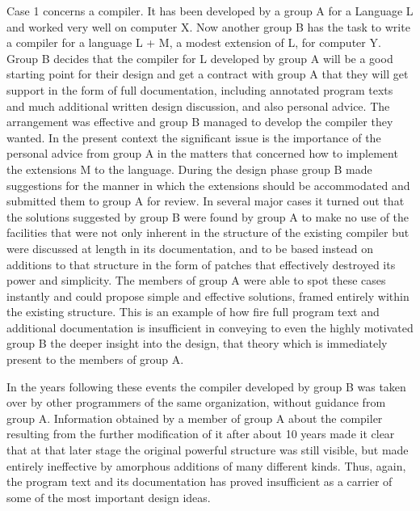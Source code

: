 \documentclass[12pt,letterpaper,twocolumn]{article}
\begin{document}
Case 1 concerns a compiler. It has been developed by a group A for a Language L and worked very well on computer X. Now another group B has the task to write a compiler for a language L + M, a modest extension of L, for computer Y. Group B decides that the compiler for L developed by group A will be a good starting point for their design and get a contract with group A that they will get support in the form of full documentation, including annotated program texts and much additional written design discussion, and also personal advice. The arrangement was effective and group B managed to develop the compiler they wanted. In the present context the significant issue is the importance of the personal advice from group A in the matters that concerned how to implement the extensions M to the language. During the design phase group B made suggestions for the manner in which the extensions should be accommodated and submitted them to group A for review. In several major cases it turned out that the solutions suggested by group B were found by group A to make no use of the facilities that were not only inherent in the structure of the existing compiler but were discussed at length in its documentation, and to be based instead on additions to that structure in the form of patches that effectively destroyed its power and simplicity. The members of group A were able to spot these cases instantly and could propose simple and effective solutions, framed entirely within the existing structure. This is an example of how fire full program text and additional documentation is insufficient in conveying to even the highly motivated group B the deeper insight into the design, that theory which is immediately present to the members of group A.

In the years following these events the compiler developed by group B was taken over by other programmers of the same organization, without guidance from group A. Information obtained by a member of group A about the compiler resulting from the further modification of it after about 10 years made it clear that at that later stage the original powerful structure was still visible, but made entirely ineffective by amorphous additions of many different kinds. Thus, again, the program text and its documentation has proved insufficient as a carrier of some of the most important design ideas.
\end{document}
